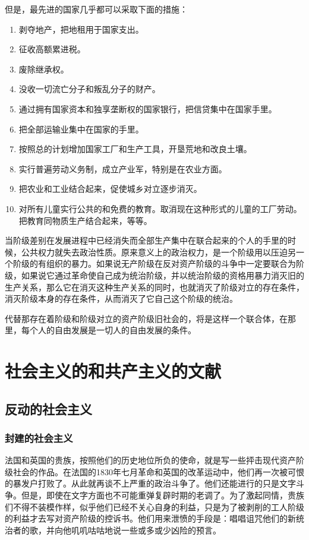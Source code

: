 \documentclass[10pt, UTF8]{book} %
\begin{document}
但是，最先进的国家几乎都可以采取下面的措施：
\begin{enumerate}[itemsep=0pt]
    \item 剥夺地产，把地租用于国家支出。
    \item 征收高额累进税。
    \item 废除继承权。
    \item 没收一切流亡分子和叛乱分子的财产。
    \item 通过拥有国家资本和独享垄断权的国家银行，把信贷集中在国家手里。
    \item 把全部运输业集中在国家的手里。
    \item 按照总的计划增加国家工厂和生产工具，开垦荒地和改良土壤。
    \item 实行普遍劳动义务制，成立产业军，特别是在农业方面。
    \item 把农业和工业结合起来，促使城乡对立逐步消灭。
    \item 对所有儿童实行公共的和免费的教育。取消现在这种形式的儿童的工厂劳动。把教育同物质生产结合起来，等等。
\end{enumerate}
当阶级差别在发展进程中已经消失而全部生产集中在联合起来的个人的手里的时候，公共权力就失去政治性质。原来意义上的政治权力，是一个阶级用以压迫另一个阶级的有组织的暴力。如果说无产阶级在反对资产阶级的斗争中一定要联合为阶级，如果说它通过革命使自己成为统治阶级，并以统治阶级的资格用暴力消灭旧的生产关系，那么它在消灭这种生产关系的同时，也就消灭了阶级对立的存在条件，消灭阶级本身的存在条件，从而消灭了它自己这个阶级的统治。

代替那存在着阶级和阶级对立的资产阶级旧社会的，将是这样一个联合体，在那里，每个人的自由发展是一切人的自由发展的条件。

\section{社会主义的和共产主义的文献}

\subsection{反动的社会主义}

\subsubsection{封建的社会主义}

法国和英国的贵族，按照他们的历史地位所负的使命，就是写一些抨击现代资产阶级社会的作品。在法国的1830年七月革命和英国的改革运动中，他们再一次被可恨的暴发户打败了。从此就再谈不上严重的政治斗争了。他们还能进行的只是文字斗争。但是，即使在文字方面也不可能重弹复辟时期的老调了。为了激起同情，贵族们不得不装模作样，似乎他们已经不关心自身的利益，只是为了被剥削的工人阶级的利益才去写对资产阶级的控诉书。他们用来泄愤的手段是：唱唱诅咒他们的新统治者的歌，并向他叽叽咕咕地说一些或多或少凶险的预言。
\end{document}

